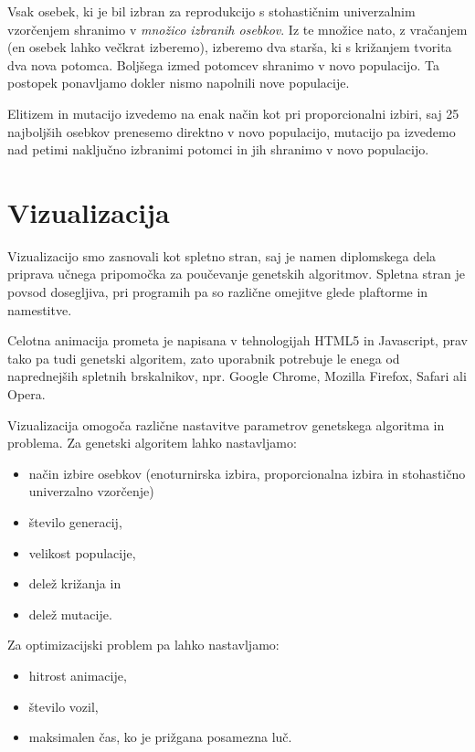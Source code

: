 \documentclass[a4paper, 12pt]{book}
\begin{document}
Vsak osebek, ki je bil izbran za reprodukcijo s stohasti\v cnim univerzalnim vzor\v cenjem shranimo v \textit{mno\v zico izbranih osebkov}. Iz te mno\v zice nato, z vra\v canjem (en osebek lahko ve\v ckrat izberemo), izberemo dva star\v sa, ki s kri\v zanjem tvorita dva nova potomca. Bolj\v sega izmed potomcev shranimo v novo populacijo. Ta postopek ponavljamo dokler nismo napolnili nove populacije.

Elitizem in mutacijo izvedemo na enak na\v cin kot pri proporcionalni izbiri, saj 25 najbolj\v sih osebkov prenesemo direktno v novo populacijo, mutacijo pa izvedemo nad petimi naklju\v cno izbranimi potomci in jih shranimo v novo populacijo.
 
\section{Vizualizacija}
Vizualizacijo smo zasnovali kot spletno stran, saj je namen diplomskega dela priprava u\v cnega pripomo\v cka za pou\v cevanje genetskih algoritmov. Spletna stran je povsod dosegljiva, pri programih pa so razli\v cne omejitve glede plaftorme in namestitve. 

Celotna animacija prometa je napisana v tehnologijah HTML5 in Javascript, prav tako pa tudi genetski algoritem, zato uporabnik potrebuje le enega od naprednej\v sih spletnih brskalnikov, npr. Google Chrome, Mozilla Firefox, Safari ali Opera.

Vizualizacija omogo\v ca razli\v cne nastavitve parametrov genetskega algoritma in problema. Za genetski algoritem lahko nastavljamo:

\begin{itemize}
\item na\v cin izbire osebkov (enoturnirska izbira, proporcionalna izbira in stohasti\v cno univerzalno vzor\v cenje)
\item \v stevilo generacij,
\item velikost populacije,
\item dele\v z kri\v zanja in
\item dele\v z mutacije.
\end{itemize}

Za optimizacijski problem pa lahko nastavljamo:

\begin{itemize}
\item hitrost animacije,
\item \v stevilo vozil,
\item maksimalen \v cas, ko je pri\v zgana posamezna lu\v c.
\end{itemize}
\end{document}
